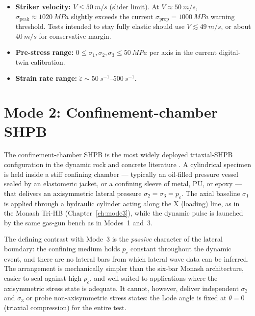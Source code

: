 \documentclass[11pt,a4paper,openany]{book}
\providecommand{\SI}[2]{\qty{#1}{#2}}
\providecommand{\SIrange}[3]{\qtyrange{#1}{#2}{#3}}
\theoremstyle{handbook}
\newcommand{\sig}{\sigma}
\newcommand{\eps}{\varepsilon}
\newcommand{\epsdot}{\dot\eps}
\newcommand{\sigprop}{\sig_{\text{prop}}}
\newcommand{\sigpeak}{\sig_{\text{peak}}}
\begin{document}
\begin{itemize}[leftmargin=*]
  \item \textbf{Striker velocity:} $V\le\SI{50}{m/s}$ (slider limit). At
        $V\approx\SI{50}{m/s}$, $\sigpeak\approx\SI{1020}{MPa}$ slightly
        exceeds the current $\sigprop=\SI{1000}{MPa}$ warning threshold.
        Tests intended to stay fully elastic should use
        $V\lesssim\SI{49}{m/s}$, or about $\SI{40}{m/s}$ for conservative
        margin.
  \item \textbf{Pre-stress range:} $0\le\sig_1,\sig_2,\sig_3\le\SI{50}{MPa}$
        per axis in the current digital-twin calibration.
  \item \textbf{Strain rate range:} $\epsdot\sim\SIrange{50}{500}{s^{-1}}$.
\end{itemize}

\chapter{Mode 2: Confinement-chamber SHPB}\label{ch:mode2}

The confinement-chamber SHPB is the most widely deployed triaxial-SHPB
configuration in the dynamic rock and concrete literature
\cite{ChenSong2011,Zhou2010,ZhangZhao2014,Zhang2022,WangZhang2026}. A cylindrical specimen is held
inside a stiff confining chamber --- typically an oil-filled pressure
vessel sealed by an elastomeric jacket, or a confining sleeve of metal,
PU, or epoxy --- that delivers an axisymmetric lateral pressure
$\sig_2=\sig_3=p_c$. The axial baseline $\sig_1$ is applied through a
hydraulic cylinder acting along the X (loading) line, as in the Monash
Tri-HB (Chapter~\ref{ch:mode3}), while the dynamic pulse is launched by
the same gas-gun bench as in Modes~1 and~3.

The defining contrast with Mode~3 is the \emph{passive} character of the
lateral boundary: the confining medium holds $p_c$ constant throughout
the dynamic event, and there are no lateral bars from which lateral wave
data can be inferred. The arrangement is mechanically simpler than the
six-bar Monash architecture, easier to seal against high $p_c$, and well
suited to applications where the axisymmetric stress state is adequate.
It cannot, however, deliver independent $\sig_2$ and $\sig_3$ or probe
non-axisymmetric stress states: the Lode angle is fixed at
$\theta=0$ (triaxial compression) for the entire test.
\end{document}
